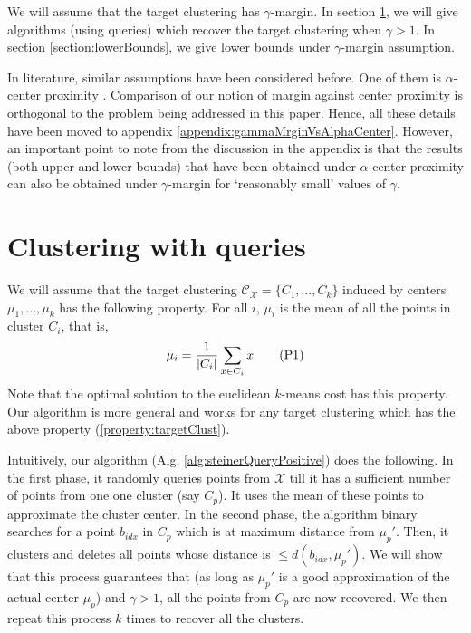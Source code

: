 \documentclass[orivec]{llncs}
\newcommand{\mc}{\mathcal}
\begin{document}
\noindent We will assume that the target clustering has $\gamma$-margin. In section \ref{section:clusteringWithQuery}, we will give algorithms (using queries) which recover the target clustering when $\gamma > 1$. In section \ref{section:lowerBounds}, we give lower bounds under $\gamma$-margin assumption.  

In literature, similar assumptions have been considered before. One of them is $\alpha$-center proximity \cite{citeStuff}. Comparison of our notion of margin against center proximity is orthogonal to the problem being addressed in this paper. Hence, all these details have been moved to appendix \ref{appendix:gammaMrginVsAlphaCenter}. However, an important point to note from the discussion in the appendix is that the results (both upper and lower bounds) that have been obtained under $\alpha$-center proximity can also be obtained under $\gamma$-margin for `reasonably small' values of $\gamma$. 

\section{Clustering with queries}
\label{section:clusteringWithQuery}

We will assume that the target clustering $\mc C_{\mc X} = \{C_1, \ldots, C_k\}$ induced by centers $\mu_1, \ldots, \mu_k$ has the following property. For all $i$, $\mu_i$ is the mean of all the points in cluster $C_i$, that is,
\begin{align}
\mu_i = \frac{1}{|C_i|}\sum_{x \in C_i} x \stepcounter{equation}\tag{P\theequation} \label{property:targetClust}
\end{align}
Note that the optimal solution to the euclidean $k$-means cost has this property. Our algorithm is more general and works for any target clustering which has the above property (\ref{property:targetClust}).

Intuitively, our algorithm (Alg. \ref{alg:steinerQueryPositive}) does the following. In the first phase, it randomly queries points from $\mc X$ till it has a sufficient number of points from one one cluster (say $C_p$). It uses the mean of these points to approximate the cluster center. In the second phase, the algorithm binary searches for a point $b_{idx}$ in $C_p$ which is at maximum distance from $\mu_p'$. Then, it clusters and deletes all points whose distance is $\le d(b_{idx}, \mu_p')$. We will show that this process guarantees that (as long as $\mu_p'$ is a good approximation of the actual center $\mu_p$) and $\gamma > 1$, all the points from $C_p$ are now recovered. We then repeat this process $k$ times to recover all the clusters.
\end{document}
